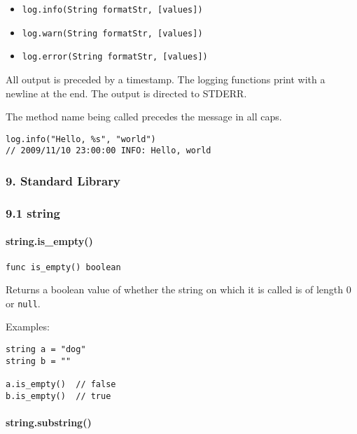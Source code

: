 \begin{itemize}
\itemsep1pt\parskip0pt
\item
  \texttt{log.info(String formatStr, {[}values{]})}
\item
  \texttt{log.warn(String formatStr, {[}values{]})}
\item
  \texttt{log.error(String formatStr, {[}values{]})}
\end{itemize}

All output is preceded by a timestamp. The logging functions print with
a newline at the end. The output is directed to STDERR.

The method name being called precedes the message in all caps.

\begin{verbatim}
log.info("Hello, %s", "world")
// 2009/11/10 23:00:00 INFO: Hello, world
\end{verbatim}

\subsubsection*{9. Standard Library}\label{standard-library}

\subsubsection*{9.1 string}\label{string}

\paragraph{string.is\_empty()}\label{string.isux5fempty}

\begin{verbatim}
func is_empty() boolean
\end{verbatim}

Returns a boolean value of whether the string on which it is called is
of length 0 or \texttt{null}.

Examples:

\begin{verbatim}
string a = "dog"
string b = ""

a.is_empty()  // false
b.is_empty()  // true
\end{verbatim}

\paragraph{string.substring()}\label{string.substring}

